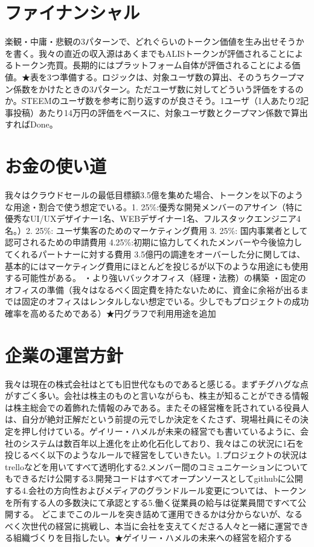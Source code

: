 \documentclass{jsarticle}
\begin{document}
\section{ファイナンシャル}
楽観・中庸・悲観の3パターンで、どれぐらいのトークン価値を生み出せそうかを書く。我々の直近の収入源はあくまでもALISトークンが評価されることによるトークン売買。長期的にはプラットフォーム自体が評価されることによる価値。★表を3つ準備する。ロジックは、対象ユーザ数の算出、そのうちクープマン係数をかけたときの3パターン。ただユーザ数に対してどういう評価をするのか。STEEMのユーザ数を参考に割り返すのが良さそう。1ユーザ（1人あたり2記事投稿）あたり14万円の評価をベースに、対象ユーザ数とクープマン係数で算出すればDone。
\section{お金の使い道}
我々はクラウドセールの最低目標額3.5億を集めた場合、トークンを以下のような用途・割合で使う想定でいる。1. 25\%:優秀な開発メンバーのアサイン（特に優秀なUI/UXデザイナー1名、WEBデザイナー1名、フルスタックエンジニア4名。）2. 25\%: ユーザ集客のためのマーケティング費用 3. 25\%: 国内事業者として認可されるための申請費用 4.25\%:初期に協力してくれたメンバーや今後協力してくれるパートナーに対する費用 3.5億円の調達をオーバーした分に関しては、基本的にはマーケティング費用にほとんどを投じるが以下のような用途にも使用する可能性がある。 ・より強いバックオフィス（経理・法務）の構築 ・固定のオフィスの準備（我々はなるべく固定費を持たないために、資金に余裕が出るまでは固定のオフィスはレンタルしない想定でいる。少しでもプロジェクトの成功確率を高めるためである）★円グラフで利用用途を追加
\section{企業の運営方針}
我々は現在の株式会社はとても旧世代なものであると感じる。まずチグハグな点がすごく多い。会社は株主のものと言いながらも、株主が知ることができる情報は株主総会での着飾れた情報のみである。またその経営権を託されている役員人は、自分が絶対正解だという前提の元でしか決定をくたさず、現場社員にその決定を押し付けている。ゲイリー・ハメルが未来の経営でも書いているように、会社のシステムは数百年以上進化を止め化石化しており、我々はこの状況に1石を投じるべく以下のようなルールで経営をしていきたい。1.プロジェクトの状況はtrelloなどを用いてすべて透明化する2.メンバー間のコミュニケーションについてもできるだけ公開する3.開発コードはすべてオープンソースとしてgithubに公開する4.会社の方向性およびメディアのグランドルール変更については、トークンを所有する人の多数決にて承認とする5.働く従業員の給与は従業員間ですべて公開する。 どこまでこのルールを突き詰めて運用できるかは分からないが、なるべく次世代の経営に挑戦し、本当に会社を支えてくださる人々と一緒に運営できる組織づくりを目指したい。★ゲイリー・ハメルの未来への経営を紹介する
\end{document}
